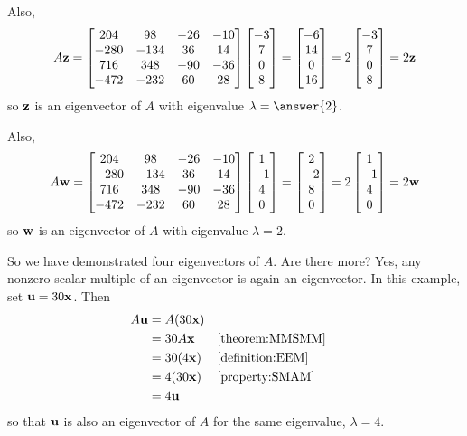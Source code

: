 \documentclass{ximera}
\begin{document}
\begin{example}
Also,
\[
A\mathbf{z}=
\begin{bmatrix}
204 & 98 & -26 & -10\\
-280 & -134 & 36 & 14\\
716 & 348 & -90 & -36\\
-472 & -232 & 60 & 28
\end{bmatrix}
\begin{bmatrix}-3\\7\\0\\8\end{bmatrix}=
\begin{bmatrix}-6\\14\\0\\16\end{bmatrix}=
2\begin{bmatrix}-3\\7\\0\\8\end{bmatrix}=2\mathbf{z}
\]
so $\mathbf{z}$ is an eigenvector of $A$ with eigenvalue $\lambda=\answer{2}$.

Also,
\[
A\mathbf{w}=
\begin{bmatrix}
204 & 98 & -26 & -10\\
-280 & -134 & 36 & 14\\
716 & 348 & -90 & -36\\
-472 & -232 & 60 & 28
\end{bmatrix}
\begin{bmatrix}1\\-1\\4\\0\end{bmatrix}=
\begin{bmatrix}2\\-2\\8\\0\end{bmatrix}=
2\begin{bmatrix}1\\-1\\4\\0\end{bmatrix}=2\mathbf{w}
\]
so $\mathbf{w}$ is an eigenvector of $A$ with eigenvalue $\lambda=2$.

So we have demonstrated four eigenvectors of $A$.  Are there more?
Yes, any nonzero scalar multiple of an eigenvector is again an
eigenvector.  In this example, set $\mathbf{u}=30\mathbf{x}$.  Then
\begin{align*}
  A\mathbf{u}
  &=A(30\mathbf{x})\\
  &=30A\mathbf{x}&&\ref{theorem:MMSMM}\\
  &=30(4\mathbf{x})&&\ref{definition:EEM}\\
  &=4(30\mathbf{x})&&\ref{property:SMAM}\\
  &=4\mathbf{u}
\end{align*}
so that $\mathbf{u}$ is also an eigenvector of $A$ for the same eigenvalue, $\lambda=4$.


\end{example}
\end{document}
